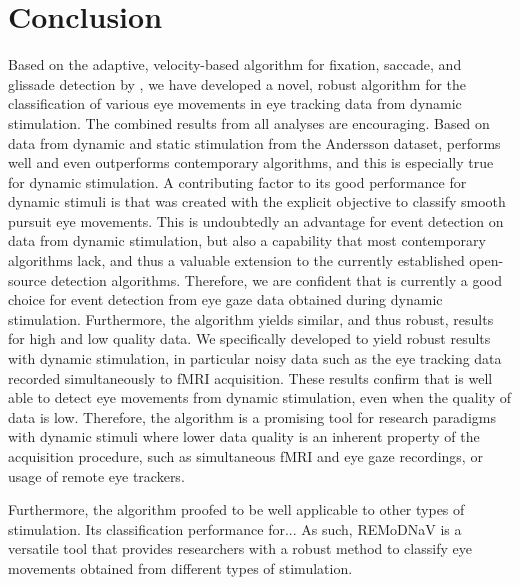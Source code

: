 \section*{Conclusion}\label{con}
Based on the adaptive, velocity-based algorithm for fixation, saccade, and
glissade detection by \cite{Nystrom2010AnData}, we have developed a novel,
robust algorithm for the classification of various eye movements in eye tracking
data from dynamic stimulation.
The combined results from all analyses are encouraging. Based on data from dynamic and static stimulation from the Andersson dataset, \remodnav performs well and even outperforms contemporary algorithms, and this is especially true for dynamic stimulation. A contributing factor to its good performance for dynamic stimuli is that \remodnav was created with the explicit objective to classify smooth pursuit eye movements. This is undoubtedly an advantage for event detection on data from dynamic stimulation, but also a capability that most contemporary algorithms lack, and thus a valuable extension to the currently established open-source detection algorithms. Therefore, we are confident that \remodnav is currently a good choice for event detection from eye gaze data obtained during dynamic stimulation. Furthermore, the algorithm yields similar, and thus robust, results for high and low quality data. We specifically developed \remodnav to yield robust results with dynamic stimulation, in particular noisy data such as the eye tracking data recorded simultaneously to fMRI acquisition. These results confirm that \remodnav is well able to detect eye movements from dynamic stimulation, even when the quality of data is low. Therefore, the algorithm is a promising tool for research paradigms with dynamic stimuli where lower data quality is an inherent property of the acquisition procedure, such as simultaneous fMRI and eye gaze recordings, or usage of remote eye trackers.

Furthermore, the algorithm proofed to be well applicable to other types of stimulation. Its classification performance for... 
As such, REMoDNaV is a versatile tool that provides researchers with a robust
method to classify eye movements obtained from different types of stimulation.



